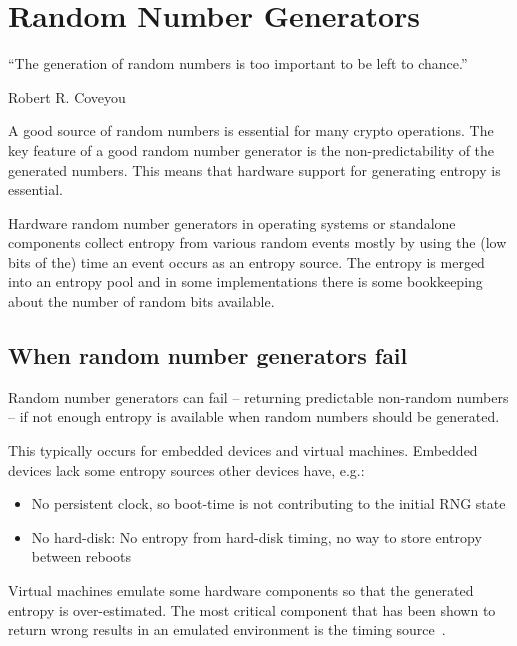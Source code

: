 \section{Random Number Generators}
\label{section:RNGs}


\epigraph{``The generation of random numbers is too important to be left to chance.''}{Robert R. Coveyou}

A good source of random numbers is essential for many crypto
operations. The key feature of a good random number generator is the
non-predictability of the generated numbers. This means that hardware
support for generating entropy is essential.


Hardware random number generators in operating systems or standalone
components collect entropy from various random events mostly by using
the (low bits of the) time an event occurs as an entropy source. The
entropy is merged into an entropy pool and in some implementations there
is some bookkeeping about the number of random bits available.

\subsection{When random number generators fail}

Random number generators can fail -- returning predictable non-random
numbers -- if not enough entropy is available when random numbers should
be generated.

This typically occurs for embedded devices and virtual machines.
Embedded devices lack some entropy sources other devices have, e.g.:

\begin{itemize}
\item No persistent clock, so boot-time is not contributing to the
    initial RNG state
\item No hard-disk: No entropy from hard-disk timing, no way to store
    entropy between reboots
\end{itemize}

Virtual machines emulate some hardware components so that the
generated entropy is over-estimated. The most critical component that
has been shown to return wrong results in an emulated environment is the
timing source~\cite{Eng11,POL11}.

